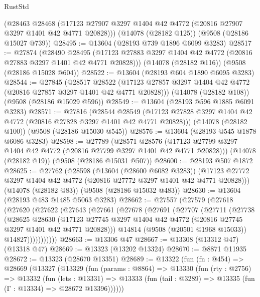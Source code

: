 \begin{lexlean}{RustStd}
\begin{coremodule}
    (@28463
      @28468
      (@17123 @27907 @3297 @1404 @42 @4772 (@20816 @27907 @3297 @1401 @42 @4771 @20828)))
    (@14078 (@28182 @125))
    (@9508 (@28186 @15027 @739))
@28495 := @13604 (@28193 @739 @1896 @6099 @3283)
@28517 := @27874
    (@28490
      @28495
      (@17123 @27883 @3297 @1404 @42 @4772 (@20816 @27883 @3297 @1401 @42 @4771 @20828)))
    (@14078 (@28182 @116))
    (@9508 (@28186 @15028 @604))
@28522 := @13604 (@28193 @604 @1890 @6095 @3283)
@28544 := @27845
    (@28517
      @28522
      (@17123 @27857 @3297 @1404 @42 @4772 (@20816 @27857 @3297 @1401 @42 @4771 @20828)))
    (@14078 (@28182 @108))
    (@9508 (@28186 @15029 @596))
@28549 := @13604 (@28193 @596 @1885 @6091 @3283)
@28571 := @27816
    (@28544
      @28549
      (@17123 @27828 @3297 @1404 @42 @4772 (@20816 @27828 @3297 @1401 @42 @4771 @20828)))
    (@14078 (@28182 @100))
    (@9508 (@28186 @15030 @545))
@28576 := @13604 (@28193 @545 @1878 @6086 @3283)
@28598 := @27789
    (@28571
      @28576
      (@17123 @27799 @3297 @1404 @42 @4772 (@20816 @27799 @3297 @1401 @42 @4771 @20828)))
    (@14078 (@28182 @19))
    (@9508 (@28186 @15031 @507))
@28600 := @28193 @507 @1872
@28625 := @27762
    (@28598
      (@13604 (@28600 @6082 @3283))
      (@17123 @27772 @3297 @1404 @42 @4772 (@20816 @27772 @3297 @1401 @42 @4771 @20828)))
    (@14078 (@28182 @83))
    (@9508 (@28186 @15032 @483))
@28630 := @13604 (@28193 @483 @1485 @5063 @3283)
@28662 := @27557
    (@27579
      (@27618
        (@27620
          (@27622
            (@27643
              (@27661
                (@27678
                  (@27691
                    (@27707
                      (@27711
                        (@27738
                          (@28625
                            @28630
                            (@17123
                              @27745
                              @3297
                              @1404
                              @42
                              @4772
                              (@20816 @27745 @3297 @1401 @42 @4771 @20828)))
                          @14814
                          (@9508 (@20501 @1968 @15033))
                          @14827)))))))))))
@28663 := @13306 @47
@28667 := @13308 (@13312 @47) (@13318 @47)
@28669 := @13323 (@13202 @13324)
@28670 := @8871 @11935
@28672 := @13323 (@28670 @13351)
@28689 := @13322
    (fun (fn : @454) =>
    @28669
      (@13327
        (@13329
          (fun (params : @8864) =>
          @13330
            (fun (rty : @2756) =>
            @13332
              (fun (lets : @13331) =>
              @13333 (fun (tail : @3289) => @13335 (fun (Γ : @13334) => @28672 @13396))))))

\end{coremodule}
\end{lexlean}
